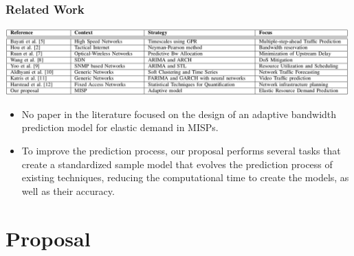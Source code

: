 \documentclass[aspectratio=169]{beamer}
\begin{document}
\subsection{}
\begin{frame}

\frametitle{Related Work}

\includegraphics[width=0.99\textwidth,angle=0]{tableRelatedWork.png}

\begin{itemize}\footnotesize
    \item No paper in the literature focused on the design of an adaptive bandwidth prediction model for elastic demand in MISPs.
    \item To improve the prediction process, our proposal performs several tasks that create a standardized sample model that evolves the prediction process of existing techniques, reducing the computational time to create the models, as well as their accuracy.
\end{itemize}

\end{frame}


\section{Proposal}

\end{document}
